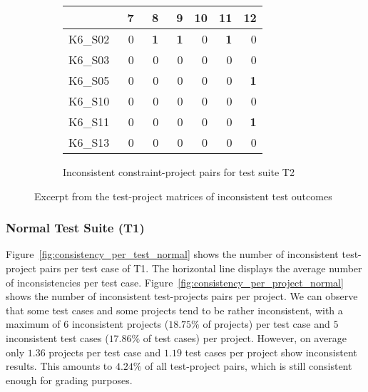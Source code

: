 \begin{figure}[htpb]
\begin{subfigure}{.4\textwidth}
        \setlength{\tabcolsep}{0.2em}
        \tiny
        \begin{tabular}{l|rrrrrr}
            \toprule
                    & \ 7        & \ 8        & \ 9        & 10         & 11         & 12         \\
            \midrule
            K6\_S02 & 0          & \textbf{1} & \textbf{1} & 0          & \textbf{1} & 0          \\
            K6\_S03 & 0          & 0          & 0          & 0          & 0          & 0          \\
            K6\_S05 & 0          & 0          & 0          & 0          & 0          & \textbf{1} \\
            K6\_S10 & 0          & 0          & 0          & 0          & 0          & 0          \\
            K6\_S11 & 0          & 0          & 0          & 0          & 0          & \textbf{1} \\
            K6\_S13 & 0          & 0          & 0          & 0          & 0          & 0          \\
            \bottomrule
        \end{tabular}
        \caption{Inconsistent constraint-project pairs for test suite T2}
        \label{tab:inconsistencies_matrix_excerpt_constraint}
        \setlength{\tabcolsep}{\defaulttabcolsep}
    \end{subfigure}

    \vspace{-3\bigskipamount}
    \caption{Excerpt from the test-project matrices of inconsistent test outcomes}
    \label{tab:inconsistencies_matrices_excerpt}
\end{figure}

\subsubsection{Normal Test Suite (T1)}

\noindent Figure~\ref{fig:consistency_per_test_normal} shows the number of inconsistent test-project pairs per test case of T1.
The horizontal line displays the average number of inconsistencies per test case.
Figure~\ref{fig:consistency_per_project_normal} shows the number of inconsistent test-projects pairs per project.
We can observe that some test cases and some projects tend to be rather inconsistent,
with a maximum of $6$ inconsistent projects ($18.75\%$ of projects) per test case and $5$ inconsistent test cases ($17.86\%$ of test cases) per project.
However, on average only $1.36$ projects per test case and $1.19$ test cases per project show inconsistent results.
This amounts to $4.24\%$ of all test-project pairs, which is still consistent enough for grading purposes.
\parspace

